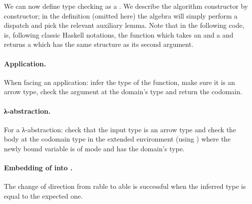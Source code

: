 \noindent
\begin{minipage}{\textwidth}
\begin{minipage}[t]{0.53\textwidth}
\end{minipage}
\begin{minipage}[t]{0.46\textwidth}
\end{minipage}
\end{minipage}

We can now define type checking as a \semrec{}. We describe the algorithm constructor
by constructor; in the  definition (omitted here) the algebra will
simply perform a dispatch and pick the relevant auxiliary lemma. Note that in the
following code, \AF{\_<\$\_} is, following classic Haskell notations, the function
which takes an  and a { } and returns a { }
which has the same structure as its second argument.

\paragraph*{Application.} When facing an application: infer the type of the function,
make sure it is an arrow type, check the argument at the domain's type and return
the codomain.
\begin{agdasnippet}
\end{agdasnippet}
%
\paragraph*{λ-abstraction.} For a λ-abstraction: check that the input
type  is an arrow type and check the body  at the
codomain type in the extended environment (using ) where the
newly bound variable is of mode  and has the domain's type.
\begin{agdasnippet}
\end{agdasnippet}
%
\paragraph*{Embedding of  into .} The change of
direction from rable to able is successful when the
inferred type is equal to the expected one.
\begin{agdasnippet}
\end{agdasnippet}
%
